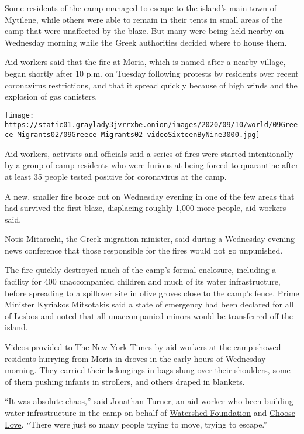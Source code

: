 Some residents of the camp managed to escape to the island's main town
of Mytilene, while others were able to remain in their tents in small
areas of the camp that were unaffected by the blaze. But many were being
held nearby on Wednesday morning while the Greek authorities decided
where to house them.

Aid workers said that the fire at Moria, which is named after a nearby
village, began shortly after 10 p.m. on Tuesday following protests by
residents over recent coronavirus restrictions, and that it spread
quickly because of high winds and the explosion of gas canisters.

\texttt{[image: https://static01.graylady3jvrrxbe.onion/images/2020/09/10/world/09Greece-Migrants02/09Greece-Migrants02-videoSixteenByNine3000.jpg]}

Aid workers, activists and officials said a series of fires were started
intentionally by a group of camp residents who were furious at being
forced to quarantine after at least 35 people tested positive for
coronavirus at the camp.

A new, smaller fire broke out on Wednesday evening in one of the few
areas that had survived the first blaze, displacing roughly 1,000 more
people, aid workers said.

Notis Mitarachi, the Greek migration minister, said during a Wednesday
evening news conference that those responsible for the fires would not
go unpunished.

The fire quickly destroyed much of the camp's formal enclosure,
including a facility for 400 unaccompanied children and much of its
water infrastructure, before spreading to a spillover site in olive
groves close to the camp's fence. Prime Minister Kyriakos Mitsotakis
said a state of emergency had been declared for all of Lesbos and noted
that all unaccompanied minors would be transferred off the island.

Videos provided to The New York Times by aid workers at the camp showed
residents hurrying from Moria in droves in the early hours of Wednesday
morning. They carried their belongings in bags slung over their
shoulders, some of them pushing infants in strollers, and others draped
in blankets.

``It was absolute chaos,'' said Jonathan Turner, an aid worker who been
building water infrastructure in the camp on behalf of
\href{https://watershed-foundation.de/en/home}{Watershed Foundation} and
\href{https://helprefugees.org/choose-love/}{Choose Love}. ``There were
just so many people trying to move, trying to escape.''

